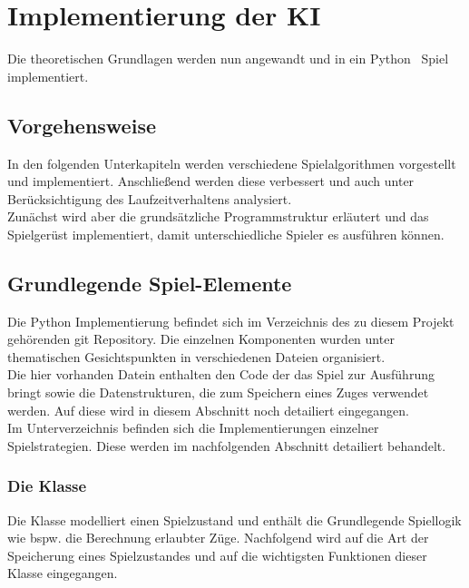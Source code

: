 \chapter{Implementierung der KI}
Die theoretischen Grundlagen werden nun angewandt und in ein Python \ot\ Spiel implementiert. 
\section{Vorgehensweise}
In den folgenden Unterkapiteln  werden verschiedene Spielalgorithmen vorgestellt und implementiert. Anschließend werden diese verbessert und auch unter Berücksichtigung des Laufzeitverhaltens analysiert.
\\Zunächst wird aber die grundsätzliche Programmstruktur erläutert und das Spielgerüst implementiert, damit unterschiedliche Spieler es ausführen können.
\section{Grundlegende Spiel-Elemente}
Die Python Implementierung befindet sich im Verzeichnis  des zu diesem Projekt gehörenden git Repository. Die einzelnen Komponenten wurden unter thematischen Gesichtspunkten in verschiedenen Dateien organisiert.
\\Die hier vorhanden Datein enthalten den Code der das Spiel zur Ausführung bringt sowie die Datenstrukturen, die zum Speichern eines Zuges verwendet werden. Auf diese wird in diesem Abschnitt noch detailiert eingegangen.
\\Im Unterverzeichnis  befinden sich die Implementierungen einzelner Spielstrategien. Diese werden im nachfolgenden Abschnitt detailiert behandelt.
\subsection{Die Klasse }
Die Klasse  modelliert einen Spielzustand und enthält die Grundlegende Spiellogik wie bspw. die Berechnung erlaubter Züge. Nachfolgend wird auf die Art der Speicherung eines Spielzustandes und auf die wichtigsten Funktionen dieser Klasse eingegangen.

